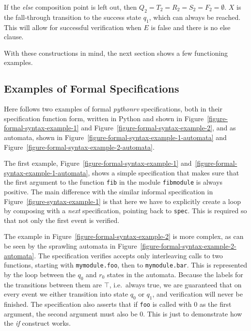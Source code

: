 \documentclass[a4paper,11pt]{kth-mag}
\begin{document}
If the \textit{else} composition point is left out, then $Q_2 = T_2 = R_2 = S_2
= F_2 = \emptyset$. $X$ is the fall-through transition to the success state
$q_1$, which can always be reached. This will allow for successful verification
when $E$ is false and there is no else clause.

With these constructions in mind, the next section shows a few functioning
examples.


\subsection{Examples of Formal Specifications}
\label{section-approach-examples-of-formal-specifications}
\lstset{language=Python,numbers=none}

Here follows two examples of formal \textit{pythonrv} specifications, both in
their specification function form, written in Python and shown in
Figure~\ref{figure-formal-syntax-example-1} and
Figure~\ref{figure-formal-syntax-example-2}, and as automata, shown in
Figure~\ref{figure-formal-syntax-example-1-automata} and
Figure~\ref{figure-formal-syntax-example-2-automata}.

The first example, Figure~\ref{figure-formal-syntax-example-1}
and~\ref{figure-formal-syntax-example-1-automata}, shows a simple specification
that makes sure that the first argument to the function \texttt{fib} in the
module \texttt{fibmodule} is always positive. The main difference with the
similar informal specification in Figure~\ref{figure-syntax-example-1} is that
here we have to explicitly create a loop by composing with a \textit{next}
specification, pointing back to \texttt{spec}. This is required so that not
only the first event is verified.

The example in Figure~\ref{figure-formal-syntax-example-2} is more complex, as
can be seen by the sprawling automata in
Figure~\ref{figure-formal-syntax-example-2-automata}. The specification
verifies accepts only interleaving calls to two functions, starting with
\texttt{mymodule.foo}, then to \texttt{mymodule.bar}. This is represented by
the loop between the $q_0$ and $r_0$ states in the automata. Because the labels
for the transitions between them are $\top$, i.e.\ always true, we are
guaranteed that on every event we either transition into state $q_0$ or $q_1$,
and verification will never be finished. The specification also asserts that if
\texttt{foo} is called with $0$ as the first argument, the second argument must
also be $0$. This is just to demonstrate how the \textit{if} construct works.
\end{document}
